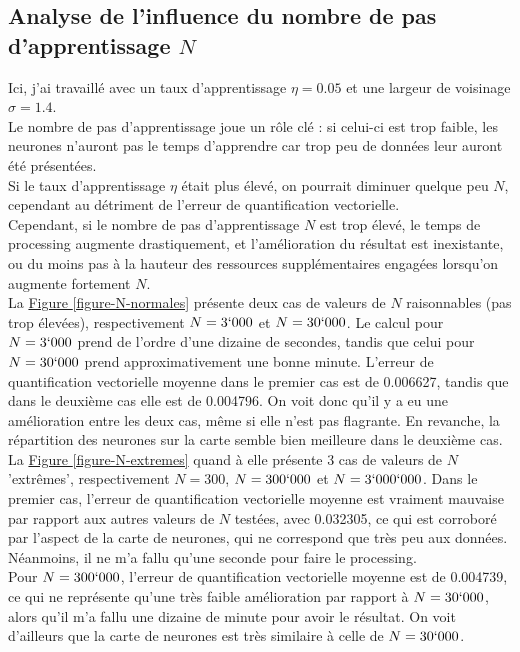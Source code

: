\documentclass{article}
\begin{document}
\subsection{Analyse de l'influence du nombre de pas d'apprentissage $N$}

Ici, j'ai travaillé avec un taux d'apprentissage $\eta = 0.05$ et une largeur de voisinage $\sigma = 1.4$.\\
Le nombre de pas d'apprentissage joue un rôle clé : si celui-ci est trop faible, les neurones n'auront pas le temps d'apprendre car trop peu de données leur auront été présentées.\\
Si le taux d'apprentissage $\eta$ était plus élevé, on pourrait diminuer quelque peu $N$, cependant au détriment de l'erreur de quantification vectorielle.\\
Cependant, si le nombre de pas d'apprentissage $N$ est trop élevé, le temps de processing augmente drastiquement, et l'amélioration du résultat est inexistante, ou du moins pas à la hauteur des ressources supplémentaires engagées lorsqu'on augmente fortement $N$.\\
La \hyperlink{figure-N-normales}{Figure \ref{figure-N-normales}} présente deux cas de valeurs de $N$ raisonnables (pas trop élevées), respectivement $N = 3`000$ et $N = 30`000$. Le calcul pour $N = 3`000$ prend de l'ordre d'une dizaine de secondes, tandis que celui pour $N = 30`000$ prend approximativement une bonne minute. L'erreur de quantification vectorielle moyenne dans le premier cas est de 0.006627, tandis que dans le deuxième cas elle est de 0.004796. On voit donc qu'il y a eu une amélioration entre les deux cas, même si elle n'est pas flagrante. En revanche, la répartition des neurones sur la carte semble bien meilleure dans le deuxième cas.\\
La \hyperlink{figure-N-extremes}{Figure \ref{figure-N-extremes}} quand à elle présente 3 cas de valeurs de $N$ 'extrêmes', respectivement $N = 300$, $N = 300`000$ et $N = 3`000`000$. Dans le premier cas, l'erreur de quantification vectorielle moyenne est vraiment mauvaise par rapport aux autres valeurs de $N$ testées, avec 0.032305, ce qui est corroboré par l'aspect de la carte de neurones, qui ne correspond que très peu aux données. Néanmoins, il ne m'a fallu qu'une seconde pour faire le processing.\\
Pour $N = 300`000$, l'erreur de quantification vectorielle moyenne est de 0.004739, ce qui ne représente qu'une très faible amélioration par rapport à $N = 30`000$, alors qu'il m'a fallu une dizaine de minute pour avoir le résultat. On voit d'ailleurs que la carte de neurones est très similaire à celle de $N = 30`000$. \\
\end{document}
